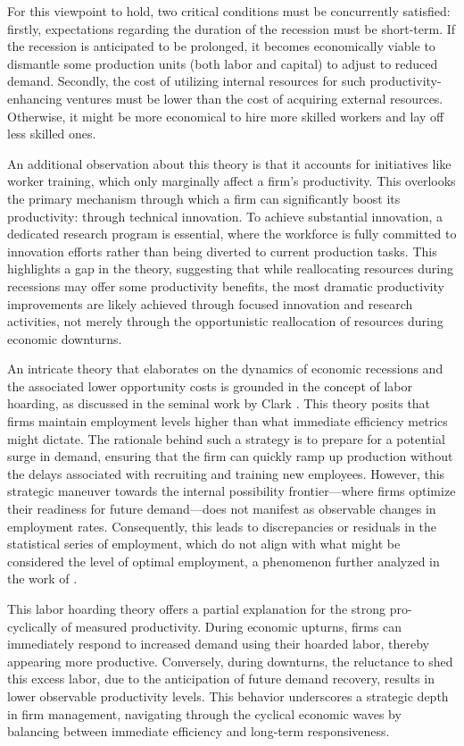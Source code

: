 \documentclass[12pt]{report}
\begin{document}
For this viewpoint to hold, two critical conditions must be concurrently satisfied: firstly, expectations regarding the
duration of the recession must be short-term. If the recession is anticipated to be prolonged, it becomes economically
viable to dismantle some production units (both labor and capital) to adjust to reduced demand. Secondly, the cost of
utilizing internal resources for such productivity-enhancing ventures must be lower than the cost of acquiring external
resources. Otherwise, it might be more economical to hire more skilled workers and lay off less skilled ones.  

An additional observation about this theory is that it accounts for initiatives like worker training, which only
marginally affect a firm's productivity. This overlooks the primary mechanism through which a firm can significantly
boost its productivity: through technical innovation. To achieve substantial innovation, a dedicated research program is
essential, where the workforce is fully committed to innovation efforts rather than being diverted to current production
tasks. This highlights a gap in the theory, suggesting that while reallocating resources during recessions may offer
some productivity benefits, the most dramatic productivity improvements are likely achieved through focused
innovation and research activities, not merely through the opportunistic reallocation of resources during economic
downturns. 

An intricate theory that elaborates on the dynamics of economic recessions and the associated lower opportunity costs is
grounded in the concept of labor hoarding, as discussed in the seminal work by Clark \cite{Cla73}. This theory posits
that firms maintain employment levels higher than what immediate efficiency metrics might dictate. The rationale behind
such a strategy is to prepare for a potential surge in demand, ensuring that the firm can quickly ramp up production
without the delays associated with recruiting and training new employees. However, this strategic maneuver towards the
internal possibility frontier—where firms optimize their readiness for future demand—does not manifest as observable
changes in employment rates. Consequently, this leads to discrepancies or residuals in the statistical series of
employment, which do not align with what might be considered the level of optimal employment, a phenomenon further
analyzed in the work of \cite{BurnCrai93}. 

This labor hoarding theory offers a partial explanation for the strong pro-cyclically of measured productivity. During
economic upturns, firms can immediately respond to increased demand using their hoarded labor, thereby appearing more
productive. Conversely, during downturns, the reluctance to shed this excess labor, due to the anticipation of future
demand recovery, results in lower observable productivity levels. This behavior underscores a strategic depth in firm
management, navigating through the cyclical economic waves by balancing between immediate efficiency and long-term
responsiveness. 
\end{document}
